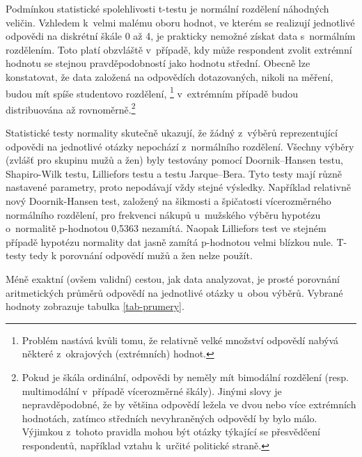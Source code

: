\documentclass[12pt,twoside,openany]{fithesis}
\begin{document}
                Podmínkou statistické spolehlivosti t-testu je normální 
rozdělení náhodných veličin. Vzhledem k~velmi malému oboru hodnot, ve 
kterém se realizují jednotlivé odpovědi na diskrétní škále 0 až 4, je 
prakticky nemožné získat data s~normálním rozdělením. Toto platí 
obzvláště v~případě, kdy může respondent zvolit extrémní hodnotu 
se stejnou pravděpodobností jako hodnotu střední. Obecně lze konstatovat, 
že data založená na odpovědích dotazovaných, nikoli na měření, budou 
mít spíše studentovo rozdělení, 
\footnote{
                    Problém nastává kvůli tomu, že relativně velké 
množství odpovědí nabývá některé z~okrajových (extrémních) hodnot.
                }
v~extrémním případě budou distribuována až 
rovnoměrně.\footnote{
                    Pokud je škála ordinální, odpovědi by neměly mít 
bimodální rozdělení (resp. multimodální v~případě vícerozměrné 
škály). Jinými slovy je nepravděpodobné, že by většina odpovědí 
ležela ve dvou nebo více extrémních hodnotách, zatímco středních 
nevyhraněných odpovědí by bylo málo. Výjimkou z~tohoto pravidla mohou 
být otázky týkající se přesvědčení respondentů, například vztahu 
k~určité politické straně.
                }

                Statistické testy normality skutečně ukazují, že žádný 
z~výběrů reprezentující odpovědi na jednotlivé otázky nepochází 
z~normálního rozdělení. Všechny výběry (zvlášť pro skupinu mužů a 
žen) byly testovány pomocí Doornik--Hansen testu, Shapiro-Wilk testu, 
Lilliefors testu a testu Jarque--Bera. Tyto testy mají různě nastavené 
parametry, proto nepodávají vždy stejné výsledky. Například relativně 
nový Doornik-Hansen test, založený na šikmosti a špičatosti vícerozměrného 
normálního rozdělení, pro frekvenci nákupů u~mužského výběru 
hypotézu o~normalitě p-hodnotou 0,5363 
nezamítá. \cite{dh-test}{} Naopak Lilliefors test ve stejném případě 
hypotézu normality dat jasně zamítá p-hodnotou velmi blízkou nule.
T-testy tedy k porovnání odpovědí mužů a žen nelze použít.

Méně exaktní (ovšem validní) cestou, jak data analyzovat, je prosté porovnání 
aritmetických průměrů odpovědí na jednotlivé otázky u~obou výběrů. 
Vybrané hodnoty zobrazuje tabulka \hyperlink{tab-prumery}{\ref{tab-prumery}}.
\end{document}
